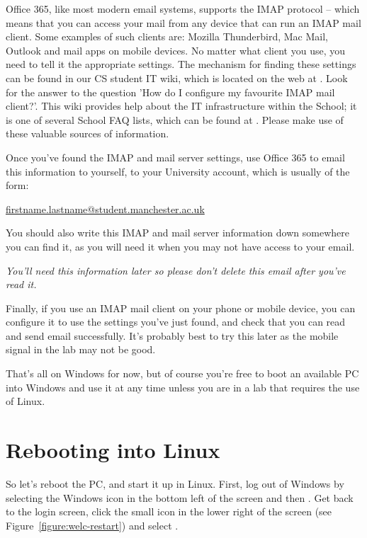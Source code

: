 \label{sec:reading-your-mail}

Office 365, like most modern email systems, supports the IMAP protocol
-- which means that you can access your mail from any device that can
run an IMAP mail client. Some examples of such clients are: Mozilla
Thunderbird, Mac Mail, Outlook and mail apps on mobile devices. No
matter what client you use, you need to tell it the appropriate
settings. The mechanism for finding these settings can be found in our
CS student IT wiki, which is located on the web at
. Look for
the answer to the question 'How do I configure my favourite IMAP mail
client?'. This wiki provides help about the IT infrastructure within
the School; it is one of several School FAQ lists, which can be found
at . Please make
use of these valuable sources of information.

Once you've found the IMAP and mail server settings, use Office 365 to email this information to yourself, to your
University account, which is usually of the form:

\url{firstname.lastname@student.manchester.ac.uk}

You should also write this IMAP and mail server information down somewhere you can find it, as you will need it   when you may not have access to your email.

\enlargethispage{\baselineskip}
\emph{You'll need this information later so please don't delete this email after you've read it.}


Finally, if you use an IMAP mail client on your phone or mobile
device, you can configure it to use the settings you've just found, and check
that you can read and send email successfully. It's probably best to
try this later as the mobile signal in the lab may not be good.

That's all on Windows for now, but of course  you're free to boot an available PC into Windows  and use it at any time unless you are in a lab that requires the use of Linux.

\section{Rebooting into Linux}
\label{sec:rebooting-into-linux}

So let's reboot the PC, and start it up in Linux. First, log out of
Windows by selecting the Windows icon in the bottom left of the screen and then . Get back to the login screen, click the
small icon in the lower right of the screen (see Figure~\ref{figure:welc-restart}) and select .

